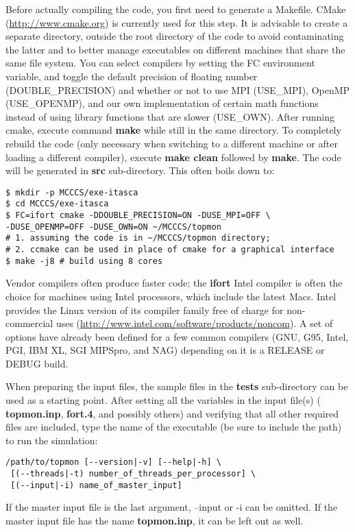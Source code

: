 \documentclass[12pt,letterpaper]{article}
\begin{document}
Before actually compiling the code, you first need to
generate a Makefile. CMake (\url{http://www.cmake.org}) is
currently used for this step. It is advisable to create a
separate directory, outside the root directory of the code
to avoid contaminating the latter and to better manage
executables on different machines that share the same file
system. You can select compilers by setting the FC
environment variable, and toggle the default precision of
floating number (DOUBLE\_PRECISION) and whether or not to
use MPI (USE\_MPI), OpenMP (USE\_OPENMP), and our own
implementation of certain math functions instead of using
library functions that are slower (USE\_OWN). After running
cmake, execute command {\bf make} while still in the same
directory. To completely rebuild the code (only necessary
when switching to a different machine or after loading a
different compiler), execute {\bf make clean} followed by
{\bf make}. The code will be generated in {\bf src}
sub-directory. This often boils down to:
\begin{verbatim}
$ mkdir -p MCCCS/exe-itasca
$ cd MCCCS/exe-itasca
$ FC=ifort cmake -DDOUBLE_PRECISION=ON -DUSE_MPI=OFF \
-DUSE_OPENMP=OFF -DUSE_OWN=ON ~/MCCCS/topmon
# 1. assuming the code is in ~/MCCCS/topmon directory;
# 2. ccmake can be used in place of cmake for a graphical interface
$ make -j8 # build using 8 cores
\end{verbatim}

Vendor compilers often produce faster code; the {\bf ifort}
Intel compiler is often the choice for machines using Intel
processors, which include the latest Macs. Intel provides
the Linux version of its compiler family free of charge for
non-commercial uses
(\url{http://www.intel.com/software/products/noncom}). A set
of options have already been defined for a few common
compilers (GNU, G95, Intel, PGI, IBM XL, SGI MIPSpro, and
NAG) depending on it is a RELEASE or DEBUG build.

When preparing the input files, the sample files in the {\bf
  tests} sub-directory can be used as a starting point.
After setting all the variables in the input file(s) ({\bf
  topmon.inp}, {\bf fort.4}, and possibly others) and
verifying that all other required files are included, type
the name of the executable (be sure to include the path) to
run the simulation:
\begin{verbatim}
/path/to/topmon [--version|-v] [--help|-h] \
 [(--threads|-t) number_of_threads_per_processor] \
 [(--input|-i) name_of_master_input]
\end{verbatim}
If the master input file is the last argument, --input or -i
can be omitted. If the master input file has the name {\bf
  topmon.inp}, it can be left out as well.
\end{document}
